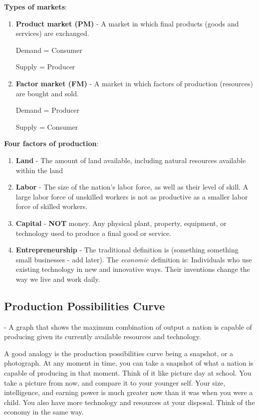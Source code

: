 \documentclass{article}
\begin{document}
    \textbf{Types of markets}:
    \begin{enumerate}
        \item{\textbf{Product market (PM)} - A market in which final products (goods and services) are exchanged.
        
        Demand = Consumer
        
        Supply = Producer}
        \item{\textbf{Factor market (FM)} - A market in which factors of production (resources) are bought and sold.
        
        Demand = Producer
        
        Supply = Consumer}
    \end{enumerate}

    \textbf{Four factors of production}:
    \begin{enumerate}
        \item{\textbf{Land} - The amount of land available, including natural resources available within the land}
        \item{\textbf{Labor} - The size of the nation's labor force, as well as their level of skill. A large labor force of unskilled workers is not as productive as a smaller labor force of skilled workers.}
        \item{\textbf{Capital} - \textbf{NOT} money. Any physical plant, property, equipment, or technology used to produce a final good or service.}
        \item{\textbf{Entrepreneurship} - The traditional definition is (something something small businesses - add later). The \textit{economic} definition is: Individuals who use existing technology in new and innovative ways. Their inventions change the way we live and work daily.}
    \end{enumerate}

    \subsection{Production Possibilities Curve} - A graph that shows the maximum combination of output a nation is capable of producing given its currently available resources and technology.
    
    A good analogy is the production possibilities curve being a snapshot, or a photograph. At any moment in time, you can take a snapshot of what a nation is capable of producing in that moment. Think of it like picture day at school. You take a picture from now, and compare it to your younger self. Your size, intelligence, and earning power is much greater now than it was when you were a child. You also have more technology and resources at your disposal. Think of the economy in the same way. 
  
\end{document}

